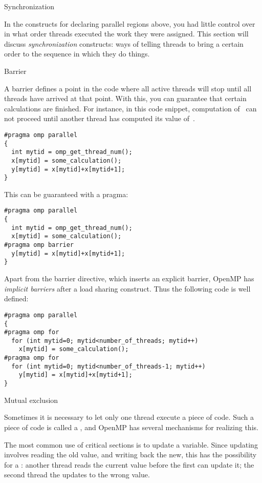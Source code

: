  {Synchronization}

In the constructs for declaring parallel regions above, you had little control over 
in what order threads executed the work they were assigned.
This section will discuss \emph{synchronization} constructs: ways of telling
threads to bring a certain order to the sequence in which they do things.

 {Barrier}

A barrier defines a point in the code where all active threads will stop
until all threads have arrived at that point. With this, you can guarantee that
certain calculations are finished. For instance, in this code snippet, computation 
of~ can not proceed until another thread has computed its value of~.
\begin{verbatim}
#pragma omp parallel 
{
  int mytid = omp_get_thread_num();
  x[mytid] = some_calculation();
  y[mytid] = x[mytid]+x[mytid+1];
}
\end{verbatim}
This can be guaranteed with a  pragma:
\begin{verbatim}
#pragma omp parallel 
{
  int mytid = omp_get_thread_num();
  x[mytid] = some_calculation();
#pragma omp barrier
  y[mytid] = x[mytid]+x[mytid+1];
}
\end{verbatim}

Apart from the barrier directive, which inserts an explicit barrier,
OpenMP has \emph{implicit barriers} after
a load sharing construct. Thus the following code is well defined:
\begin{verbatim}
#pragma omp parallel 
{
#pragma omp for
  for (int mytid=0; mytid<number_of_threads; mytid++)
    x[mytid] = some_calculation();
#pragma omp for
  for (int mytid=0; mytid<number_of_threads-1; mytid++)
    y[mytid] = x[mytid]+x[mytid+1];
}
\end{verbatim}

 {Mutual exclusion}

Sometimes it is necessary to let only one thread execute a piece of code.
Such a piece of code is called a , and
OpenMP has several mechanisms for realizing this.

The most common use of critical sections is to update a variable. Since updating
involves reading the old value, and writing back the new, this has the possibility
for a : another thread reads the current value
before the first can update it; the second thread the updates to the wrong value.


